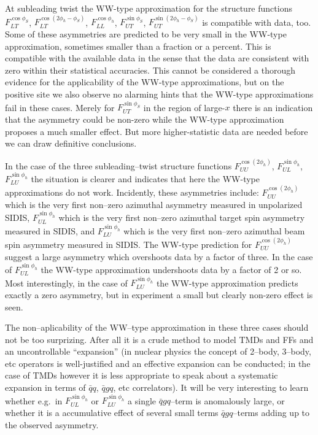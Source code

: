 \documentclass[a4paper,11pt]{article}
\begin{document}
At subleading twist the WW-type approximation for the
structure functions 
	$F_{LT}^{\cos\phi_S}$,
	$F_{LT}^{\cos(2\phi_h-\phi_S)}$,
	$F_{LL}^{\cos\phi_h}$,
	$F_{UT}^{\sin\phi_S}$,
	$F_{UT}^{\sin(2\phi_h-\phi_S)}$
is compatible with data, too. Some of these asymmetries are
predicted to be very small in the WW-type approximation,
sometimes smaller than a fraction or a percent. This is
compatible with the available data in the sense that the
data are consistent with zero within their statistical
accuracies. This cannot be considered a thorough evidence
for the applicability of the WW-type approximations, but
on the positive site we also observe no alarming hints
that the WW-type approximations fail in these cases.
Merely for $F_{UT}^{\sin\phi_S}$ in the region of large-$x$
there is an indication that the asymmetry could be 
non-zero while the WW-type approximation proposes
a much smaller effect. But more higher-statistic data 
are needed before we can draw definitive conclusions.

In the case of the three subleading--twist structure functions 
	$F_{UU}^{\cos(2\phi_h)}$, 
	$F_{UL}^{\sin\phi_h}$,
	$F_{LU}^{\sin\phi_h}$
the situation is clearer and indicates that here the WW-type
approximations do not work.
Incidently, these asymmetries include: 	$F_{UU}^{\cos(2\phi_h)}$ which 
is the very first non--zero azimuthal asymmetry measured in unpolarized SIDIS,
$F_{UL}^{\sin\phi_h}$ which is the very first non--zero azimuthal target spin 
asymmetry measured in SIDIS, and $F_{LU}^{\sin\phi_h}$ which is the 
very first non--zero azimuthal beam spin asymmetry measured in SIDIS.
The WW-type prediction for $F_{UU}^{\cos(2\phi_h)}$ suggest a large asymmetry
which overshoots data by a factor of three. In the case of $F_{UL}^{\sin\phi_h}$
the WW-type approximation undershoots data by a factor of 2 or so.
Most interestingly, in the case of $F_{LU}^{\sin\phi_h}$ the WW-type
approximation predicts exactly a zero asymmetry, but in experiment
a small but clearly non-zero effect is seen.

The non--aplicability of the WW--type approximation in these three
cases should not be too surprizing. After all it is a crude method
to model TMDs and FFs and an uncontrollable ``expansion''
(in nuclear physics the concept of 2--body, 3--body, etc operators
is well-justified and an effective expansion can be conducted; in
the case of TMDs however it is less appropriate to speak about a
systematic expansion in terms of $\bar qq$, $\bar qgq$, etc 
correlators). It will be very interesting to learn whether e.g.\ 
in $F_{UL}^{\sin\phi_h}$ or $F_{LU}^{\sin\phi_h}$ a single $\bar qgq$--term 
is anomalously large, or whether it is a accumulative effect of 
several small terms $\bar qgq$--terms adding up to the observed asymmetry.
\end{document}
